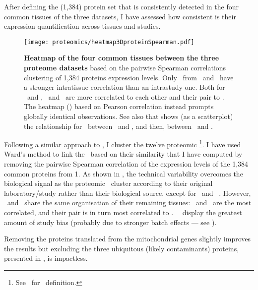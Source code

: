 After defining the (1,384) protein set that is consistently detected
in the four common tissues of the three datasets,
I have assessed how consistent is
their expression quantification across tissues and studies.

\begin{figure}[!htbp]
    \texttt{[image: proteomics/heatmap3DproteinSpearman.pdf]}\centering
    \caption[Heatmap of the four common tissues between the three proteome
    datasets]{\label{fig:prot3Dheatmap}\textbf{Heatmap of the four common tissues
    between the three proteome datasets} based on
    the pairwise Spearman correlations clustering of 1,384 proteins expression levels.
    Only \heart\ from \cutler\ and \pandey\ have a stronger intratissue correlation
    than an intrastudy one.
    Both for \pandey\ and \cutler,
    \pancreas\ and \lung\ are more correlated to each other and their pair to \ovary.
    The heatmap ()
    based on Pearson correlation instead prompts globally identical observations.
    See also  that shows (as a scatterplot)
    the relationship for \Heart\ between \pandey\ and \cutler, and then,
     between
    \pandey\ and \kuster.
    }
\end{figure}

Following a similar approach to ,
I cluster the twelve proteomic \treps\footnote{See~ for \treps\ definition.}.
I have used Ward's method to link the \treps\ based on their similarity that
I have computed by removing the pairwise Spearman correlation
of the expression levels of the 1,384 common proteins from 1.
As shown in ,
the technical variability overcomes the biological signal
as the proteomic \treps\ cluster according to their original laboratory/study
rather than their biological source,
except for \cutler\ and \pandey\ \heart.
However,
\cutler\ and \pandey\ share the same organisation of their remaining tissues:
\pancreas\ and \lung\ are the most correlated,
and their pair is in turn most correlated to \ovary.
\kuster\ \treps\ display the greatest amount of study bias
(probably due to stronger batch effects --- see ).

Removing the proteins translated from the mitochondrial genes slightly
improves the results
but excluding the three ubiquitous (likely contaminants) proteins, presented
in ,
is impactless.

